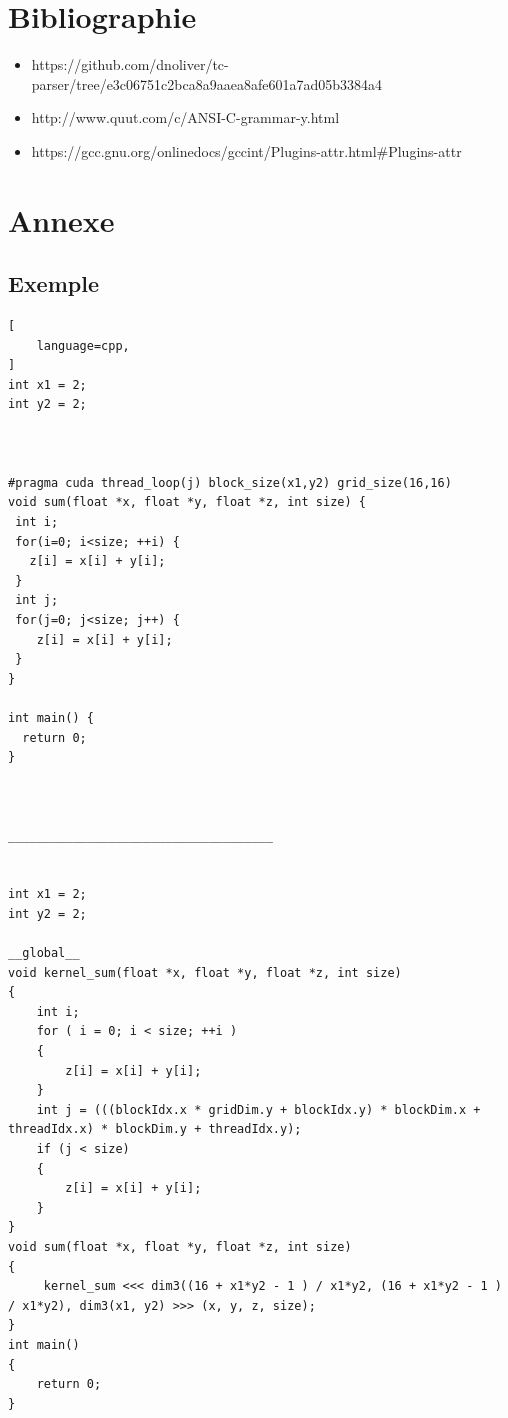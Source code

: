 \documentclass{article}
\begin{document}
\printglossary[title=List of Terms,toctitle=Terms and abbreviations]



\section*{Bibliographie}
\begin{itemize}

\item https://github.com/dnoliver/tc-parser/tree/e3c06751c2bca8a9aaea8afe601a7ad05b3384a4
\item http://www.quut.com/c/ANSI-C-grammar-y.html
\item https://gcc.gnu.org/onlinedocs/gccint/Plugins-attr.html\#Plugins-attr

\end{itemize}
	

\newpage
	\section{Annexe}

	\subsection{Exemple}

	\begin{lstlisting}[
    language=cpp,
]
int x1 = 2;
int y2 = 2;



#pragma cuda thread_loop(j) block_size(x1,y2) grid_size(16,16)
void sum(float *x, float *y, float *z, int size) {
 int i;
 for(i=0; i<size; ++i) {
   z[i] = x[i] + y[i];
 }
 int j;
 for(j=0; j<size; j++) {
    z[i] = x[i] + y[i];
 }
}

int main() {
  return 0;
}



_____________________________________


int x1 = 2;
int y2 = 2;

__global__
void kernel_sum(float *x, float *y, float *z, int size)
{
	int i;
	for ( i = 0; i < size; ++i )
	{
		z[i] = x[i] + y[i];
	}
	int j = (((blockIdx.x * gridDim.y + blockIdx.y) * blockDim.x + threadIdx.x) * blockDim.y + threadIdx.y);
	if (j < size)
	{
		z[i] = x[i] + y[i];
	}
}
void sum(float *x, float *y, float *z, int size)
{
	 kernel_sum <<< dim3((16 + x1*y2 - 1 ) / x1*y2, (16 + x1*y2 - 1 ) / x1*y2), dim3(x1, y2) >>> (x, y, z, size);
}
int main()
{
	return 0;
}
\end{lstlisting}
\end{document}
